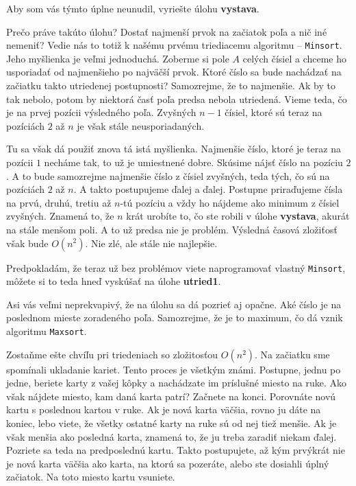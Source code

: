 \medskip

Aby som vás týmto úplne neunudil, vyriešte úlohu \textbf{vystava}.

\medskip

Prečo práve takúto úlohu? Dostať najmenší prvok na začiatok poľa a nič iné nemeniť? Vedie nás to
totiž k našému prvému triediacemu algoritmu -- \texttt{Minsort}. Jeho myšlienka je veľmi jednoduchá.
Zoberme si pole $A$ celých čísiel a chceme ho usporiadať od najmenšieho po najväčší prvok. Ktoré
číslo sa bude nachádzať na začiatku takto utriedenej postupnosti? Samozrejme, že to najmenšie. Ak by
to tak nebolo, potom by niektorá časť poľa predsa nebola utriedená. Vieme teda, čo je na prvej
pozícii výsledného poľa. Zvyšných $n-1$ čísiel, ktoré sú teraz na pozíciách $2$ až $n$ je však stále
neusporiadaných.

Tu sa však dá použiť znova tá istá myšlienka. Najmenšie číslo, ktoré je teraz na pozícii $1$ necháme
tak, to už je umiestnené dobre. Skúsime nájsť číslo na pozíciu $2$. A to bude samozrejme najmenšie
číslo z čísiel zvyšných, teda tých, čo sú na pozíciách $2$ až $n$. A takto postupujeme ďalej a
ďalej. Postupne priraďujeme čísla na prvú, druhú, tretiu až $n$-tú pozíciu a vždy ho nájdeme ako
minimum z čísiel zvyšných. Znamená to, že $n$ krát urobíte to, čo ste robili v úlohe
\textbf{vystava}, akurát na stále menšom poli. A to už predsa nie je problém.
Výsledná časová zložiťosť však bude $O(n^2)$. Nie zlé, ale stále nie najlepšie.

\medskip

Predpokladám, že teraz už bez problémov viete naprogramovať vlastný \texttt{Minsort}, môžete si to
teda hneď vyskúšať na úlohe \textbf{utried1}.

\medskip

Asi vás veľmi neprekvapivý, že na úlohu sa dá pozrieť aj opačne. Aké číslo je na poslednom mieste
zoradeného poľa. Samozrejme, že je to maximum, čo dá vznik algoritmu \texttt{Maxsort}.

\bigskip

Zostaňme ešte chvíľu pri triedeniach so zložitosťou $O(n^2)$. Na začiatku sme spomínali ukladanie
kariet. Tento proces je všetkým známi. Postupne, jednu po jedne, beriete karty z vašej kôpky a
nachádzate im príslušné miesto na ruke. Ako však nájdete miesto, kam daná karta patrí? Začnete na
konci. Porovnáte novú kartu s poslednou kartou v ruke. Ak je nová karta väčšia, rovno ju dáte na
koniec, lebo viete, že všetky ostatné karty na ruke sú od nej tiež menšie. Ak je však menšia ako
posledná karta, znamená to, že ju treba zaradiť niekam ďalej. Pozriete sa teda na predposlednú
kartu. Takto postupujete, až kým prvýkrát nie je nová karta väčšia ako karta, na ktorú sa pozeráte,
alebo ste dosiahli úplný začiatok. Na toto miesto kartu vsuniete.

